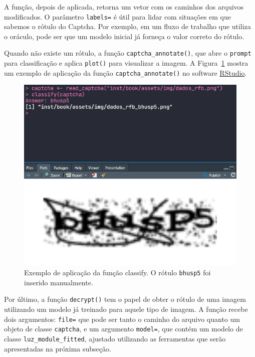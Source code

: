 \documentclass[12pt,twoside,brazilian]{book}
\begin{document}
A função, depois de aplicada, retorna um vetor com os caminhos dos
arquivos modificados. O parâmetro \texttt{labels=} é útil para lidar com
situações em que sabemos o rótulo do Captcha. Por exemplo, em um fluxo
de trabalho que utiliza o oráculo, pode ser que um modelo inicial já
forneça o valor correto do rótulo.

Quando não existe um rótulo, a função \texttt{captcha\_annotate()}, que
abre o \texttt{prompt} para classificação e aplica \texttt{plot()} para
visualizar a imagem. A Figura~\ref{fig-exemplo-classify} mostra um
exemplo de aplicação da função \texttt{captcha\_annotate()} no software
\href{https://posit.co/download/rstudio-desktop/}{RStudio}.

\begin{figure}

{\centering \includegraphics{./assets/img/exemplo_classify.png}

}

\caption{\label{fig-exemplo-classify}Exemplo de aplicação da função
classify. O rótulo \texttt{bhusp5} foi inserido manualmente.}

\end{figure}

Por último, a função \texttt{decrypt()} tem o papel de obter o rótulo de
uma imagem utilizando um modelo já treinado para aquele tipo de imagem.
A função recebe dois argumentos: \texttt{file=} que pode ser tanto o
caminho do arquivo quanto um objeto de classe \texttt{captcha}, e um
argumento \texttt{model=}, que contém um modelo de classe
\texttt{luz\_module\_fitted}, ajustado utilizando as ferramentas que
serão apresentadas na próxima subseção.
\end{document}
